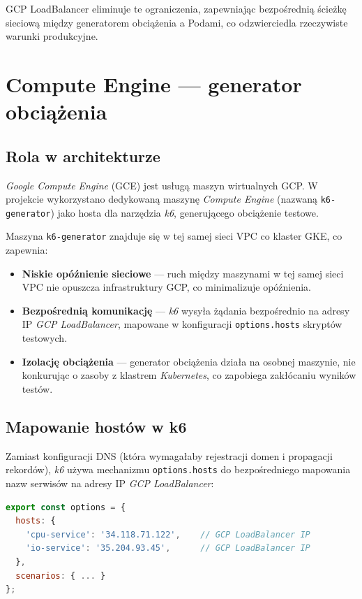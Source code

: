 GCP LoadBalancer eliminuje te ograniczenia, zapewniając bezpośrednią ścieżkę sieciową między generatorem obciążenia a Podami, co odzwierciedla rzeczywiste warunki produkcyjne.

\section{Compute Engine — generator obciążenia}

\subsection{Rola w architekturze}

\textit{Google Compute Engine} (GCE) jest usługą maszyn wirtualnych GCP. W projekcie wykorzystano dedykowaną maszynę \textit{Compute Engine} (nazwaną \texttt{k6-generator}) jako hosta dla narzędzia \textit{k6}, generującego obciążenie testowe.

Maszyna \texttt{k6-generator} znajduje się w tej samej sieci VPC co klaster GKE, co zapewnia:
\begin{itemize}
  \item \textbf{Niskie opóźnienie sieciowe} — ruch między maszynami w tej samej sieci VPC nie opuszcza infrastruktury GCP, co minimalizuje opóźnienia.
  \item \textbf{Bezpośrednią komunikację} — \textit{k6} wysyła żądania bezpośrednio na adresy IP \textit{GCP LoadBalancer}, mapowane w konfiguracji \texttt{options.hosts} skryptów testowych.
  \item \textbf{Izolację obciążenia} — generator obciążenia działa na osobnej maszynie, nie konkurując o zasoby z klastrem \textit{Kubernetes}, co zapobiega zakłócaniu wyników testów.
\end{itemize}

\subsection{Mapowanie hostów w k6}

Zamiast konfiguracji DNS (która wymagałaby rejestracji domen i propagacji rekordów), \textit{k6} używa mechanizmu \texttt{options.hosts} do bezpośredniego mapowania nazw serwisów na adresy IP \textit{GCP LoadBalancer}:

\begin{lstlisting}[language=javascript, caption={Mapowanie hostów w \texttt{options.hosts} skryptu \textit{k6}}, label={lst:k6-hosts-mapping}]
export const options = {
  hosts: {
    'cpu-service': '34.118.71.122',    // GCP LoadBalancer IP
    'io-service': '35.204.93.45',      // GCP LoadBalancer IP
  },
  scenarios: { ... }
};
\end{lstlisting}

